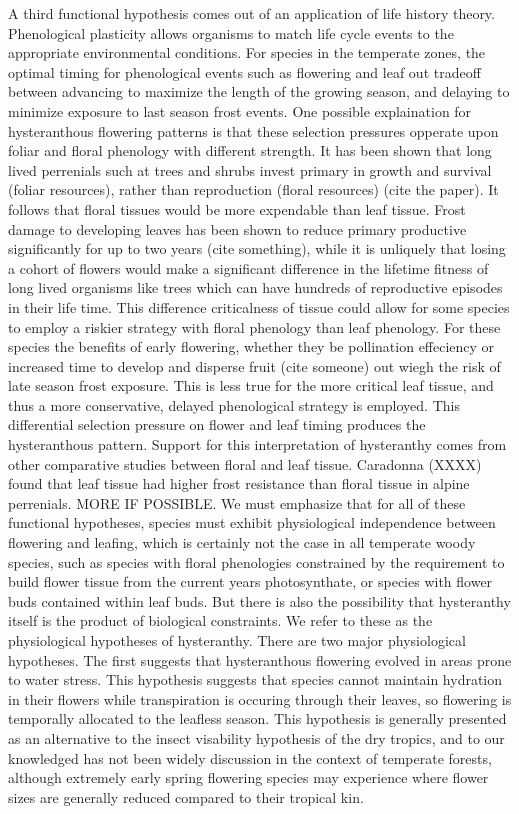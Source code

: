 \documentclass{article}\usepackage[]{graphicx}\usepackage[]{color}
\begin{document}
A third functional hypothesis comes out of an application of life history theory. Phenological plasticity allows organisms to match life cycle events to the appropriate environmental conditions. For species in the temperate zones, the optimal timing for phenological events such as flowering and leaf out tradeoff between advancing to maximize the length of the growing season, and delaying to minimize exposure to last season frost events. One possible explaination for hysteranthous flowering patterns is that these selection pressures opperate upon foliar and floral phenology with different strength. It has been shown that long lived perrenials such at trees and shrubs invest primary in growth and survival (foliar resources), rather than reproduction (floral resources) (cite the paper). It follows that floral tissues would be more expendable than leaf tissue. Frost damage to developing leaves has been shown to reduce primary productive significantly for up to two years (cite something), while it is unliquely that losing a cohort of flowers would make a significant difference in the lifetime fitness of long lived organisms like trees which can have hundreds of reproductive episodes in their life time. This difference criticalness of tissue could allow for some species to employ a riskier strategy with floral phenology than leaf phenology. For these species the benefits of early flowering, whether they be pollination effeciency or increased time to develop and disperse fruit (cite someone) out wiegh the risk of late season frost exposure. This is less true for the more critical leaf tissue, and thus a more conservative, delayed phenological strategy is employed. This differential selection pressure on flower and leaf timing produces the hysteranthous pattern. Support for this interpretation of hysteranthy comes from other comparative studies between floral and leaf tissue. Caradonna (XXXX) found that leaf tissue had higher frost resistance than floral tissue in alpine perrenials. MORE IF POSSIBLE. 
We must emphasize that for all of these functional hypotheses, species must exhibit physiological independence between flowering and leafing, which is certainly not the case in all temperate woody species, such as species with floral phenologies constrained by the requirement to build flower tissue from the current years photosynthate, or species with flower buds contained within leaf buds. But there is also the possibility that hysteranthy itself is the product of biological constraints. We refer to these as the physiological hypotheses of hysteranthy.
There are two major physiological hypotheses. The first suggests that hysteranthous flowering evolved in areas prone to water stress. This hypothesis suggests that species cannot maintain hydration in their flowers while transpiration is occuring through their leaves, so flowering is temporally allocated to the leafless season. This hypothesis is generally presented as an alternative to the insect visability hypothesis of the dry tropics, and to our knowledged has not been widely discussion in the context of temperate forests, although extremely early spring flowering species may experience where flower sizes are generally reduced compared to their tropical kin.\\ 
\end{document}
